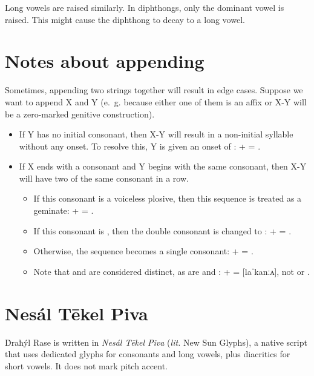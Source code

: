 \documentclass{book}
\begin{document}
Long vowels are raised similarly. In diphthongs, only the dominant vowel is raised. This might cause the diphthong to decay to a long vowel.

\section{Notes about appending}
\label{sec:append}

Sometimes, appending two strings together will result in edge cases. Suppose we want to append X and Y (e.~g. because either one of them is an affix or X-Y will be a zero-marked genitive construction).

\begin{itemize}
    \item If Y has no initial consonant, then X-Y will result in a non-initial syllable without any onset. To resolve this, Y is given an onset of :  +  = .
    \item If X ends with a consonant and Y begins with the same consonant, then X-Y will have two of the same consonant in a row.
    \begin{itemize}
        \item If this consonant is a voiceless plosive, then this sequence is treated as a geminate:  +  = .
        \item If this consonant is , then the double consonant is changed to :  +  = .
        \item Otherwise, the sequence becomes a single consonant:  +  = .
        \item Note that  and  are considered distinct, as are  and :  +  =  [laˈkanːʌ], not  or .
    \end{itemize}
\end{itemize}

\section{Nesál Tēkel Piva}

Ḋraħýl Rase is written in \emph{Nesál Tēkel Piva} (\emph{lit.} New Sun Glyphs), a native script that uses dedicated glyphs for consonants and long vowels, plus diacritics for short vowels. It does not mark pitch accent.
\end{document}
